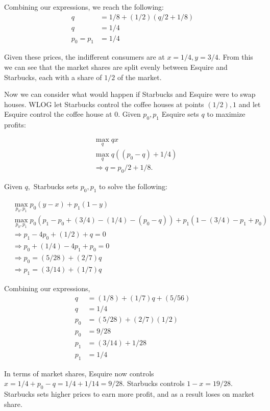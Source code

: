 \documentclass[11pt]{article} %
\begin{document}
Combining our expressions, we reach the following:
\begin{align*}
q &= 1/8 + (1/2)(q/2 + 1/8)\\
q &= 1/4\\
p_0 = p_1 &= 1/4
\end{align*}

Given these prices, the indifferent consumers are at $x = 1/4, y = 3/4$. From this we can see that the market shares are split evenly between Esquire and Starbucks, each with a share of $1/2$ of the market.

Now we can consider what would happen if Starbucks and Esquire were to swap houses. WLOG let Starbucks control the coffee houses at points $(1/2),1$ and let Esquire control the coffee house at $0$. Given $p_0,p_1$ Esquire sets $q$ to maximize profits:

\begin{align*}
&\max_{q} qx\\
&\max_{q} q((p_0 - q) + 1/4)\\
&\Rightarrow q = p_0/2 + 1/8.
\end{align*}

Given $q,$ Starbucks sets $p_0,p_1$ to solve the following:

\begin{align*}
&\max_{p_0,p_1} p_0(y-x) + p_1(1-y)\\
&\max_{p_0,p_1} p_0(p_1 - p_0 + (3/4) - (1/4) - (p_0 - q)) + p_1(1 - (3/4) - p_1 + p_0)\\
&\Rightarrow p_1 - 4p_0 + (1/2) + q  = 0 \\
&\Rightarrow p_0  + (1/4) - 4p_1 + p_0 = 0  \\
&\Rightarrow p_0 = (5/28) + (2/7)q \\
&\Rightarrow p_1 = (3/14) + (1/7)q
\end{align*}

Combining our expressions,
\begin{align*}
q &= (1/8) + (1/7)q + (5/56)\\
q &= 1/4 \\
p_0 &= (5/28) + (2/7)(1/2) \\
p_0 &= 9/28\\
p_1 &= (3/14) + 1/28 \\
p_1 &= 1/4
\end{align*}

In terms of market shares, Esquire now controls $x = 1/4 + p_0 - q = 1/4 + 1/14 = 9/28$. Starbucks controls $1-x = 19/28$. Starbucks sets higher prices to earn more profit, and as a result loses on market share.
\end{document}
